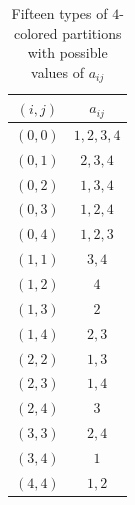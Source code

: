 \documentclass[12pt]{amsart}
\numberwithin{equation}{section}
\theoremstyle{plain}
\theoremstyle{definition}
\begin{document}
\begin{table}[htbp]\caption{Fifteen types of $4$-colored partitions with possible values of $a_{ij}$}\label{table:aij}
\centering
\begin{tabular}{|c|c|}
\hline
$(i,j)$  & $a_{ij}$ \\
\hline
$(0,0)$ & $1,2,3,4$ \\
$(0,1)$ & $2,3,4$ \\
$(0,2)$ & $1,3,4$ \\
$(0,3)$ & $1,2,4$ \\
$(0,4)$ & $1,2,3$ \\
$(1,1)$ & $3,4$ \\
$(1,2)$ & $4$ \\
$(1,3)$ & $2$ \\
$(1,4)$ & $2,3$ \\
$(2,2)$ & $1,3$ \\
$(2,3)$ & $1,4$ \\
$(2,4)$ & $3$ \\
$(3,3)$ & $2,4$ \\
$(3,4)$ & $1$ \\
$(4,4)$ & $1,2$ \\
\hline
\end{tabular}
\end{table}
\end{document}
